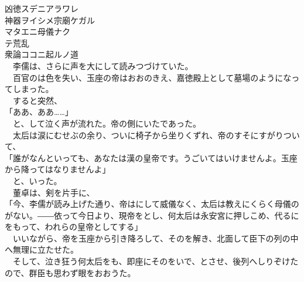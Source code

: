 \documentclass[
  paper=a5,
  fontsize=10pt,
  jafontsize=9.5pt,
  tate,                  %
  open_bracket_pos=nibu, %
]{jlreq}
\begin{document}
凶徳スデニアラワレ\\


神器ヲイシメ宗廟ケガル\\

マタエニ母儀ナク\\

テ荒乱\\


衆論ココニ起ルノ道\\



　李儒は、さらに声を大にして読みつづけていた。\\


　百官のは色を失い、玉座の帝はおおのきえ、嘉徳殿上として墓場のようになってしまった。\\


　すると突然、\\


「ああ、ああ……」\\


　と、して泣く声が流れた。帝の側にいたであった。\\


　太后は涙にむせぶの余り、ついに椅子から坐りくずれ、帝のすそにすがりついて、\\


「誰がなんといっても、あなたは漢の皇帝です。うごいてはいけませんよ。玉座から降ってはなりませんよ」\\


　と、いった。\\


　董卓は、剣を片手に、\\


「今、李儒が読み上げた通り、帝はにして威儀なく、太后は教えにくらく母儀のがない。――依って今日より、現帝をとし、何太后は永安宮に押しこめ、代るにをもって、われらの皇帝としてする」\\


　いいながら、帝を玉座から引き降ろして、そのを解き、北面して臣下の列の中へ無理に立たせた。\\


　そして、泣き狂う何太后をも、即座にそのをいで、とさせ、後列へしりぞけたので、群臣も思わず眼をおおうた。\\
\end{document}
